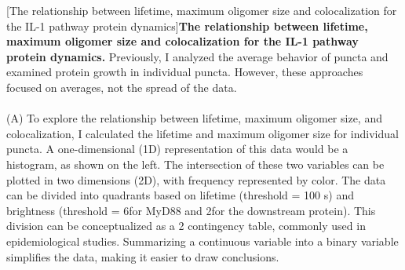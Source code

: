 \begin{centering}
\captionsetup{parbox=none}
[The relationship between lifetime, maximum oligomer size and colocalization for the IL-1 pathway protein dynamics]{\textbf{The relationship between lifetime, maximum oligomer size and colocalization for the IL-1 pathway protein dynamics.} Previously, I analyzed the average behavior of puncta and examined protein growth in individual puncta. However, these approaches focused on averages, not the spread of the data. 
\\
\\
(A) To explore the relationship between lifetime, maximum oligomer size, and colocalization, I calculated the lifetime and maximum oligomer size for individual puncta. A one-dimensional (1D) representation of this data would be a histogram, as shown on the left. The intersection of these two variables can be plotted in two dimensions (2D), with frequency represented by color. The data can be divided into quadrants based on lifetime (threshold = 100 s) and brightness (threshold = 6\times for MyD88 and 2\times for the downstream protein). This division can be conceptualized as a 2 contingency table, commonly used in epidemiological studies. Summarizing a continuous variable into a binary variable simplifies the data, making it easier to draw conclusions.
}
\end{centering}
